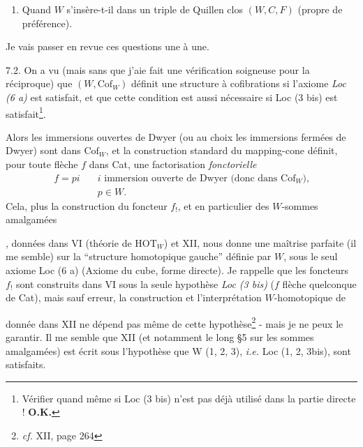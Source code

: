 \begin{enumerate}[label=1 bis)]
\item Quand $W$ s'insère-t-il dans un triple de Quillen clos $(W,C,F)$ (propre de préférence).
\end{enumerate}

Je vais passer en revue ces questions une à une.

7.2. On a vu (mais sans que j'aie fait une vérification soigneuse pour la réciproque) que $(W,\mathrm{Cof}_W)$ définit une structure à cofibrations si l'axiome \textit{Loc (6 a)} est satisfait, et que cette condition est aussi nécessaire si Loc (3 bis) est satisfait\footnote[45]{Vérifier quand même si Loc (3 bis) n'est pas déjà utilisé dans la partie directe ! \textbf{O.K.}}.

Alors les immersions ouvertes de Dwyer (ou au choix les immersions fermées de Dwyer) sont dans $\mathrm{Cof}_W$, et la construction standard du mapping-cone définit, pour toute flèche $f$ dans Cat, une factorisation \textit{fonctorielle}
\[
\begin{aligned}
f = pi \quad & i \text{ immersion ouverte de Dwyer (donc dans } \mathrm{Cof}_W\text{),}\\
& p \in W.
\end{aligned}
\]
Cela, plus la construction du foncteur $f_!$, et en particulier des $W$-sommes amalgamées
, données dans VI (théorie de $\mathrm{HOT}_W$) et XII, nous donne une maîtrise parfaite (il me semble) sur la “structure homotopique gauche” définie par $W$, sous le seul axiome Loc (6 a) (Axiome du cube, forme directe). Je rappelle que les foncteurs $f_!$ sont construits dans VI sous la seule hypothèse \textit{Loc (3 bis)} ($f$ flèche quelconque de Cat), mais sauf erreur, la construction
et l'interprétation $W$-homotopique de
donnée dans XII ne dépend pas même de cette hypothèse\footnote[46]{\textit{cf.} XII, page 264} - mais je ne peux le garantir. Il me semble que XII (et notamment le long §5 sur les sommes amalgamées) est écrit sous l'hypothèse que W (1, 2, 3), \textit{i.e.} Loc (1, 2, 3bis), sont satisfaits.


